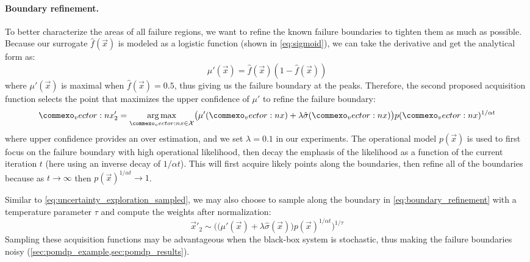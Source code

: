 \paragraph{Boundary refinement.} To better characterize the areas of all failure regions, we want to refine the known failure boundaries to tighten them as much as possible.
Because our surrogate $\hat{f}(\vec{x})$ is modeled as a logistic function (shown in \cref{eq:sigmoid}), we can take the derivative and get the analytical form as:
\begin{equation}
    \mu'(\vec{x}) = \hat{f}(\vec{x})(1 - \hat{f}(\vec{x}))
\end{equation}
where $\mu'(\vec{x})$ is maximal when $\hat{f}(\vec{x}) = 0.5$, thus giving us the failure boundary at the peaks.
Therefore, the second proposed acquisition function selects the point that maximizes the upper confidence of $\mu'$ to refine the failure boundary:
\begin{equation}
    \vec{x}'_2 = \argmax_{\vec{x} \in \mathcal{X}} \bigl(\mu'(\vec{x}) + \lambda\hat{\sigma}(\vec{x})\bigr)p(\vec{x})^{1/\alpha t} \label{eq:boundary_refinement}
\end{equation}
where upper confidence provides an over estimation, and we set $\lambda = 0.1$ in our experiments.
The operational model $p(\vec{x})$ is used to first focus on the failure boundary with high operational likelihood, then decay the emphasis of the likelihood as a function of the current iteration $t$ (here using an inverse decay of $1/\alpha t$).
This will first acquire likely points along the boundaries, then refine all of the boundaries because as $t \to \infty$ then $p(\vec{x})^{1/\alpha t} \to 1$.

Similar to \cref{eq:uncertainty_exploration_sampled}, we may also choose to sample along the boundary in \cref{eq:boundary_refinement} with a temperature parameter $\tau$ and compute the weights after normalization:
\begin{equation}
    \vec{x}'_2 \sim \big(\bigl(\mu'(\vec{x}) + \lambda\hat{\sigma}(\vec{x})\bigr)p(\vec{x})^{1/\alpha t}\big)^{1/\tau} \label{eq:boundary_refinement_sampled}
\end{equation}
Sampling these acquisition functions may be advantageous when the black-box system is stochastic, thus making the failure boundaries noisy (\cref{sec:pomdp_example,sec:pomdp_results}).

